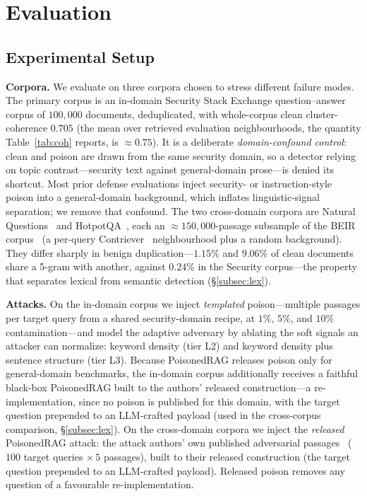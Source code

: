 \documentclass[10pt,journal,compsoc]{IEEEtran}
\begin{document}
\section{Evaluation}
\label{sec:eval}
\subsection{Experimental Setup}

\noindent\textbf{Corpora.} We evaluate on three corpora chosen to stress
different failure modes. The primary corpus is an in-domain Security Stack
Exchange question--answer corpus of $100{,}000$ documents, deduplicated, with
whole-corpus clean cluster-coherence $0.705$ (the mean over retrieved evaluation
neighbourhoods, the quantity Table~\ref{tab:coh} reports, is $\approx\!0.75$).
It is a deliberate \emph{domain-confound control}: clean and poison are drawn from
the same security domain, so a detector relying on topic contrast---security text
against general-domain prose---is denied its shortcut. Most prior defense
evaluations inject security- or instruction-style poison into a general-domain
background, which inflates linguistic-signal separation; we remove that confound.
The two cross-domain corpora are Natural Questions~\cite{nq} and
HotpotQA~\cite{hotpotqa}, each an $\approx\!150{,}000$-passage subsample of the
BEIR corpus~\cite{beir} (a per-query Contriever~\cite{contriever} neighbourhood plus
a random background). They differ sharply in benign duplication---$1.15\%$ and $9.06\%$ of
clean documents share a 5-gram with another, against $0.24\%$ in the Security
corpus---the property that separates lexical from semantic detection
(\S\ref{subsec:lex}).

\noindent\textbf{Attacks.} On the in-domain corpus we inject \emph{templated}
poison---multiple passages per target query from a shared security-domain recipe,
at $1\%$, $5\%$, and $10\%$ contamination---and model the adaptive adversary by
ablating the soft signals an attacker can normalize: keyword density (tier L2) and
keyword density plus sentence structure (tier L3). Because PoisonedRAG releases
poison only for general-domain benchmarks, the in-domain corpus additionally
receives a faithful black-box PoisonedRAG built to the authors' released
construction---a re-implementation, since no poison is published for this domain, with the
target question prepended to an LLM-crafted payload (used in the cross-corpus comparison,
\S\ref{subsec:lex}). On the
cross-domain corpora we inject the \emph{released} PoisonedRAG attack: the attack
authors' own published
adversarial passages~\cite{poisonedrag} ($100$ target queries $\times\,5$
passages), built to their released construction (the target question prepended to
an LLM-crafted payload). Released poison removes any question of a favourable
re-implementation.
\end{document}

